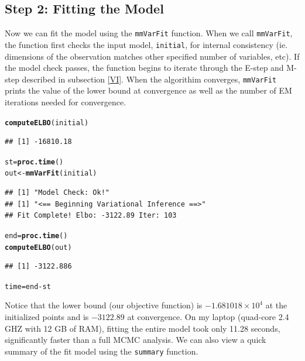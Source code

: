 \documentclass{article}\usepackage[]{graphicx}\usepackage[]{color}
\makeatletter
\newcommand{\hlopt}[1]{\textcolor[rgb]{0,0,0}{#1}}%
\newcommand{\hlstd}[1]{\textcolor[rgb]{0.345,0.345,0.345}{#1}}%
\newcommand{\hlkwb}[1]{\textcolor[rgb]{0.69,0.353,0.396}{#1}}%
\newcommand{\hlkwd}[1]{\textcolor[rgb]{0.737,0.353,0.396}{\textbf{#1}}}%
\newenvironment{kframe}{%
 \def\at@end@of@kframe{}%
 \ifinner\ifhmode%
  \def\at@end@of@kframe{\end{minipage}}%
  \begin{minipage}{\columnwidth}%
 \fi\fi%
 \def\FrameCommand##1{\hskip\@totalleftmargin \hskip-\fboxsep
 \colorbox{shadecolor}{##1}\hskip-\fboxsep
     \hskip-\linewidth \hskip-\@totalleftmargin \hskip\columnwidth}%
 \MakeFramed {\advance\hsize-\width
   \@totalleftmargin\z@ \linewidth\hsize
   \@setminipage}}%
 {\par\unskip\endMakeFramed%
 \at@end@of@kframe}
\newenvironment{knitrout}{}{} %
\renewenvironment{knitrout}{\begin{singlespace}}{\end{singlespace}}
\makeatother
\begin{document}
\subsection*{Step 2: Fitting the Model}
Now we can fit the model using the \texttt{mmVarFit} function. When we call \texttt{mmVarFit}, the function first checks the input model, \texttt{initial}, for internal consistency (ie. dimensions of the observation matches other specified number of variables, etc). If the model check passes, the function begins to iterate through the E-step and M-step described in subsection \ref{VI}. When the algorithim converges, \texttt{mmVarFit} prints the value of the lower bound at convergence as well as the number of EM iterations needed for convergence.

\begin{knitrout}
\color{fgcolor}\begin{kframe}
\begin{alltt}
\hlkwd{computeELBO}\hlstd{(initial)}
\end{alltt}
\begin{verbatim}
## [1] -16810.18
\end{verbatim}
\begin{alltt}
\hlstd{st} \hlkwb{=} \hlkwd{proc.time}\hlstd{()}
\hlstd{out} \hlkwb{<-} \hlkwd{mmVarFit}\hlstd{(initial)}
\end{alltt}
\begin{verbatim}
## [1] "Model Check: Ok!"
## [1] "<== Beginning Variational Inference ==>"
## Fit Complete! Elbo: -3122.89 Iter: 103
\end{verbatim}
\begin{alltt}
\hlstd{end} \hlkwb{=} \hlkwd{proc.time}\hlstd{()}
\hlkwd{computeELBO}\hlstd{(out)}
\end{alltt}
\begin{verbatim}
## [1] -3122.886
\end{verbatim}
\begin{alltt}
\hlstd{time} \hlkwb{=} \hlstd{end} \hlopt{-} \hlstd{st}
\end{alltt}
\end{kframe}
\end{knitrout}

Notice that the lower bound (our objective function) is \ensuremath{-1.681018\times 10^{4}} at the initialized points and is \ensuremath{-3122.89} at convergence. On my laptop (quad-core 2.4 GHZ with 12 GB of RAM), fitting the entire model took only 11.28 seconds, significantly faster than a full MCMC analysis.  
We can also view a quick summary of the fit model using the \texttt{summary} function.
\end{document}
